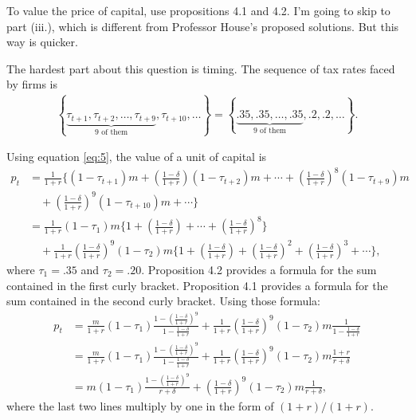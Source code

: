 \documentclass[12pt]{pracjourn_rwr}
\theoremstyle{definition}
\theoremstyle{remark}
\begin{document}
To value the price of capital, use propositions 4.1 and 4.2.
I'm going to skip to part (iii.), which is different from Professor House's proposed solutions.
But this way is quicker.

The hardest part about this question is timing.
The sequence of tax rates faced by firms is
\begin{align*}
\left\{ \underbrace{\tau_{t+1},\tau_{t+2},\dots,\tau_{t+9}}_{\text{9 of them}},\tau_{t+10},\dots \right\} =
\left\{ \underbrace{.35, .35, \dots, .35}_{\text{9 of them}},.2, .2,\dots \right\}.
\end{align*}

Using equation \eqref{eq:5}, the value of a unit of capital is
\begin{align*}
p_{t} &= \frac{1}{1+r} \Bigg\{ (1-\tau_{t+1})m + \left( \frac{1-\delta}{1+r} \right)(1-\tau_{t+2})m + \cdots  +
\left( \frac{1-\delta}{1+r} \right)^{8} (1-\tau_{t+9}) m \\
&\quad + \left( \frac{1-\delta}{1+r} \right)^{9} (1-\tau_{t+10}) m + \cdots \Bigg\} \\
&= \frac{1}{1+r} (1-\tau_{1})m \Bigg\{ 1 + \left( \frac{1-\delta}{1+r} \right) + \cdots  +
\left( \frac{1-\delta}{1+r} \right)^{8} \Bigg\} \\
&\quad + \frac{1}{1+r} \left( \frac{1-\delta}{1+r} \right)^{9}(1-\tau_{2})m
\Bigg\{
1 + \left( \frac{1-\delta}{1+r} \right) + \left( \frac{1-\delta}{1+r} \right)^{2} + \left( \frac{1-\delta}{1+r} \right)^{3} + \cdots
\Bigg\},
\end{align*}
where $\tau_{1} = .35$ and $\tau_{2} = .20$.
Proposition 4.2 provides a formula for the sum contained in the first curly bracket.
Proposition 4.1 provides a formula for the sum contained in the second curly bracket.
Using those formula:
\begin{align*}
p_{t} &= \frac{m}{1+r} (1-\tau_{1}) \frac{1 - \left( \frac{1-\delta}{1+r} \right)^{9}}{1 - \frac{1-\delta}{1+r}} +
\frac{1}{1+r}\left( \frac{1-\delta}{1+r} \right)^{9}(1-\tau_{2})m \frac{1}{1 - \frac{1-\delta}{1+r}} \\
&= \frac{m}{1+r} (1-\tau_{1}) \frac{1 - \left( \frac{1-\delta}{1+r} \right)^{9}}{1 - \frac{1-\delta}{1+r}} +
\frac{1}{1+r} \left( \frac{1-\delta}{1+r} \right)^{9}(1-\tau_{2})m \frac{1+r}{r + \delta} \\
&= m (1-\tau_{1}) \frac{1 - \left( \frac{1-\delta}{1+r} \right)^{9}}{r+\delta} +
\left( \frac{1-\delta}{1+r} \right)^{9}(1-\tau_{2})m \frac{1}{r + \delta},
\end{align*}
where the last two lines multiply by one in the form of $(1+r) / (1+r)$.
\end{document}
